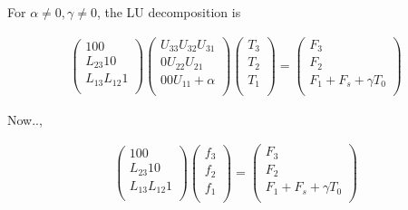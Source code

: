 For \(\alpha \neq 0, \gamma \neq 0\), the LU decomposition is

\begin{eqnarray}
  \left( \begin{array}{lll}
         1       0       0      \\
         L_{23}  1       0      \\
         L_{13}  L_{12}  1      \\
         \end{array} \right)
  \left( \begin{array}{lll}
         U_{33}  U_{32}  U_{31} \\
         0       U_{22}  U_{21} \\
         0       0       U_{11}+\alpha \\
         \end{array} \right)
  \left( \begin{array}{l}
         T_3 \\ T_2 \\ T_1 \\
         \end{array} \right)
  = 
  \left(  \begin{array}{l}
          F_3 \\ F_2 \\ F_1 + F_s + \gamma T_0 \\
          \end{array} \right)
\end{eqnarray}

Now..,

\begin{eqnarray}
  \left( \begin{array}{lll}
         1       0       0      \\
         L_{23}  1       0      \\
         L_{13}  L_{12}  1      \\
         \end{array} \right)
  \left( \begin{array}{l}
         f_3 \\ f_2 \\ f_1 \\
         \end{array} \right)
  = 
  \left(  \begin{array}{l}
          F_3 \\ F_2 \\ F_1 + F_s + \gamma T_0 \\
          \end{array} \right)
\end{eqnarray}

